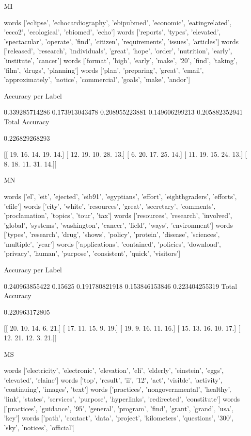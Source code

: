 \documentclass[11pt]{article}
\begin{document}
\begin{verbatium}
MI


words
['eclipse', 'echocardiography', 'ebipubmed', 'economic', 'eatingrelated', 'ecco2', 'ecological', 'ebiomed', 'echo']
words
['reports', 'types', 'elevated', 'spectacular', 'operate', 'find', 'citizen', 'requirements', 'issues', 'articles']
words
['released', 'research', 'individuals', 'great', 'hope', 'order', 'nutrition', 'early', 'institute', 'cancer']
words
['format', 'high', 'early', 'make', '20', 'find', 'taking', 'film', 'drugs', 'planning']
words
['plan', 'preparing', 'great', 'email', 'approximately', 'notice', 'commercial', 'goals', 'make', 'andor']

Accuracy per Label

0.339285714286
0.173913043478
0.208955223881
0.149606299213
0.205882352941
Total Accuracy

0.226829268293


[[ 19.  16.  14.  19.  14.]
 [ 12.  19.  10.  28.  13.]
 [  6.  20.  17.  25.  14.]
 [ 11.  19.  15.  24.  13.]
 [  8.  18.  11.  31.  14.]]


MN


words
['el', 'eit', 'ejected', 'eib91', 'egyptians', 'effort', 'eighthgraders', 'efforts', 'efile']
words
['city', 'white', 'resources', 'great', 'secretary', 'comments', 'proclamation', 'topics', 'tour', 'tax']
words
['resources', 'research', 'involved', 'global', 'systems', 'washington', 'cancer', 'field', 'ways', 'environment']
words
['types', 'research', 'drug', 'shows', 'policy', 'protein', 'disease', 'sciences', 'multiple', 'year']
words
['applications', 'contained', 'policies', 'download', 'privacy', 'human', 'purpose', 'consistent', 'quick', 'visitors']

Accuracy per Label

0.240963855422
0.15625
0.191780821918
0.153846153846
0.223404255319
Total Accuracy

0.220963172805


[[ 20.  10.  14.   6.  21.]
 [ 17.  11.  15.   9.  19.]
 [ 19.   9.  16.  11.  16.]
 [ 15.  13.  16.  10.  17.]
 [ 12.  21.  12.   3.  21.]]


MS


words
['electricity', 'electronic', 'elevation', 'eli', 'elderly', 'einstein', 'eggs', 'elevated', 'elaine']
words
['top', 'result', 'ii', '12', 'act', 'visible', 'activity', 'continuing', 'images', 'text']
words
['practices', 'nongovernmental', 'healthy', 'link', 'states', 'services', 'purpose', 'hyperlinks', 'redirected', 'constitute']
words
['practices', 'guidance', '95', 'general', 'program', 'find', 'grant', 'grand', 'usa', 'key']
words
['path', 'contact', 'data', 'project', 'kilometers', 'questions', '300', 'sky', 'notices', 'official']


\end{verbatium}
\end{document}
